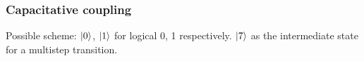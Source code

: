 \documentclass[10pt]{beamer}
\begin{document}



\begin{frame}
\frametitle{Capacitative coupling}
\begin{figure}
	\centering
\end{figure}

Possible scheme: $\ket{0}$, $\ket{1}$ for logical 0, 1 respectively. $\ket{7}$ as the intermediate state for a multistep transition.
\end{frame}

\end{document}
